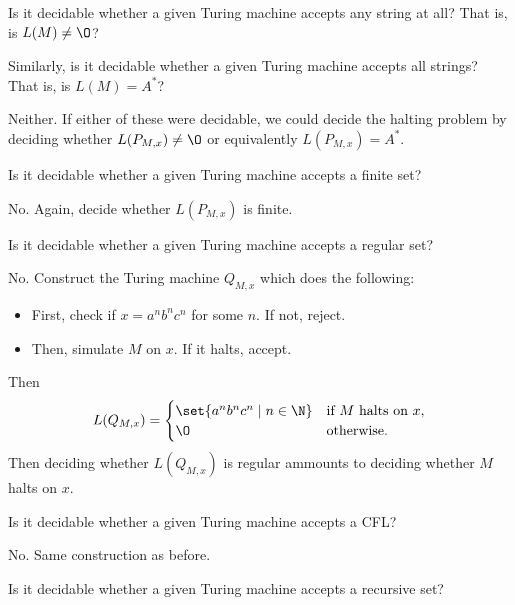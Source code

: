\begin{exercise} \label{thm:decidability:any}
    Is it decidable whether a given Turing machine accepts any string
    at all?
    That is, is $L(M) \ne \O$?

    Similarly, is it decidable whether a given Turing machine accepts
    all strings?
    That is, is $L(M) = A^*$?
\end{exercise}
\begin{solution}
    Neither.
    If either of these were decidable,
    we could decide the halting problem by deciding whether
    $L(P_{M, x}) \ne \O$ or equivalently $L(P_{M, x}) = A^*$.
\end{solution}

\begin{exercise} \label{thm:decidability:finite}
    Is it decidable whether a given Turing machine accepts a finite set?
\end{exercise}
\begin{solution}
    No.
    Again, decide whether $L(P_{M, x})$ is finite.
\end{solution}

\begin{exercise} \label{thm:decidability:regular}
    Is it decidable whether a given Turing machine accepts a regular set?
\end{exercise}
\begin{solution}
    No.
    Construct the Turing machine $Q_{M, x}$ which does the following:
    \begin{itemize}
        \item First, check if $x = a^nb^nc^n$ for some $n$.
            If not, reject.
        \item Then, simulate $M$ on $x$.
            If it halts, accept.
    \end{itemize}
    Then \[
        L(Q_{M, x}) = \begin{cases}
            \set{a^n b^n c^n \mid n \in \N}
                & \text{if } M \text{ halts on } x, \\
            \O
                & \text{otherwise}.
        \end{cases}
    \] Then deciding whether $L(Q_{M, x})$ is regular ammounts to deciding
    whether $M$ halts on $x$.
\end{solution}

\begin{exercise} \label{thm:decidability:context_free}
    Is it decidable whether a given Turing machine accepts a CFL?
\end{exercise}
\begin{solution}
    No.
    Same construction as before.
\end{solution}

\begin{exercise}
    Is it decidable whether a given Turing machine accepts a recursive set?
\end{exercise}
